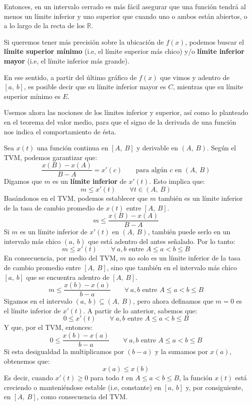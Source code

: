 \documentclass[12pt]{article}
\begin{document}
Entonces, en un intervalo cerrado es más fácil asegurar que una función tendrá al menos un límite inferior y uno superior que cuando uno o ambos están abiertos, o a lo largo de la recta de los $\mathbb{R}$.

Si queremos tener más precisión sobre la ubicación de $f(x)$, podemos buscar el \textbf{límite superior mínimo} (i.e, el límite superior más chico) y/o \textbf{límite inferior mayor} (i.e, el límite inferior más grande).

En ese sentido, a partir del último gráfico de $f(x)$ que vimos y adentro de $[a, \ b]$, es posible decir que su límite inferior mayor es $C$, mientras que su límite superior mínimo es $E$.

Usemos ahora las nociones de los límites inferior y superior, así como lo planteado en el teorema del valor medio, para que el signo de la derivada de una función nos indica el comportamiento de ésta.

Sea $x(t)$ una función continua en $[A, \ B]$ y derivable en $(A, \ B)$. Según el TVM, podemos garantizar que:
\[
  \frac{x(B) - x(A)}{B - A} = x'(c) \qquad \text{para algún } c \text{ en } (A, \ B)
\]
Digamos que $m$ es un \textbf{límite inferior} de $x'(t)$. Esto implica que:
\[
  m \leq x'(t) \qquad \forall t \in (A, \ B)
\]
Basándonos en el TVM, podemos establecer que $m$ también es un límite inferior de la tasa de cambio promedio de $x(t)$ entre $[A, \ B]$.
\[
  m \leq \frac{x(B) - x(A)}{B - A}
\]
Si $m$ es un límite inferior de $x'(t)$ en $(A, \ B)$, también puede serlo en un intervalo más chico $(a, \ b)$ que está adentro del antes señalado. Por lo tanto:
\[
  m \leq x'(t) \qquad \forall \ a, b \text{ entre } A \leq a < b \leq B
\]
En consecuencia, por medio del TVM, $m$ no solo es un límite inferior de la tasa de cambio promedio entre $[A, \ B]$, sino que también en el intervalo más chico $[a, \ b]$ que se encuentra adentro de $[A, \ B]$.
\[
  m \leq \frac{x(b) - x(a)}{b - a} \qquad \forall \ a, b \text{ entre } A \leq a < b \leq B
\]
Sigamos en el intervalo $(a, \ b) \subseteq (A, \ B)$, pero ahora definamos que $m = 0$ es el límite inferior de $x'(t)$. A partir de lo anterior, sabemos que:
%
%
\[
  0 \leq x'(t) \qquad \forall \ a, b \text{ entre } A \leq a < b \leq B
\]
Y que, por el TVM, entonces:
\[
  0 \leq \frac{x(b) - x(a)}{b - a} \qquad \forall \ a, b \text{ entre } A \leq a < b \leq B
\]
Si esta desigualdad la multiplicamos por $(b - a)$ y la sumamos por $x(a)$, obtenemos que:
\[
  x(a) \leq x(b)
\]
Es decir, cuando $x'(t) \geq 0$ para todo $t$ en $A \leq a < b \leq B$, la función $x(t)$ está creciendo o manteniéndose estable (i.e, constante) en $[a, \ b]$ y, por consiguiente, en $[A, \ B]$, como consecuencia del TVM.
\end{document}
